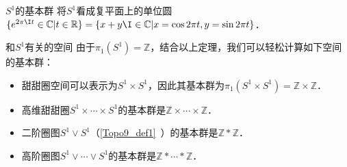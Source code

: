 
\begin{example}{$S^1$的基本群}
将$S^1$看成复平面上的单位圆$\{e^{2\pi\I t}\in\mathbb{C}|t\in\mathbb{R}\}=\{x+y\I\in\mathbb{C}|x=\cos{2\pi t}, y=\sin{2\pi t}\}$．
\end{example}

\begin{example}{和$S^1$有关的空间}
由于$\pi_1(S^1)=\mathbb{Z}$，结合以上定理，我们可以轻松计算如下空间的基本群：
\begin{itemize}
\item 甜甜圈空间可以表示为$S^1\times S^1$，因此其基本群为$\pi_1(S^1\times S^1)=\mathbb{Z}\times\mathbb{Z}$．
\item 高维甜甜圈$S^1\times\cdots\times S^1$的基本群是$\mathbb{Z}\times\cdots\times\mathbb{Z}$．
\item 二阶圈图$S^1\vee S^1$（\autoref{Topo9_def1}~）的基本群是$\mathbb{Z}*\mathbb{Z}$．
\item 高阶圈图$S^1\vee\cdots\vee S^1$的基本群是$\mathbb{Z}*\cdots*\mathbb{Z}$．
\end{itemize}

\end{example}



